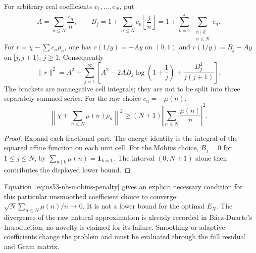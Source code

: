 \begin{proposition}
\label{prop:ns53-nb-divisor-cells}
For arbitrary real coefficients $c_1,\ldots,c_N$, put
\[
 A=\sum_{n\leq N}\frac{c_n}{n},\qquad
 B_j=1+\sum_{n\leq N}c_n\left\lfloor\frac jn\right\rfloor
     =1+\sum_{k=1}^j\ \sum_{\substack{n\mid k\\n\leq N}}c_n.
\]
For $r=\chi-\sum c_n\rho_n$, one has $r(1/y)=-Ay$ on $(0,1)$
and $r(1/y)=B_j-Ay$ on $[j,j+1)$, $j\geq1$. Consequently
\begin{equation}
 \|r\|^2=A^2+\sum_{j=1}^{\infty}
 \left[A^2-2AB_j\log\left(1+\frac1j\right)
          +\frac{B_j^2}{j(j+1)}\right].
 \label{eq:ns53-nb-divisor-energy}
\end{equation}
The brackets are nonnegative cell integrals; they are not to be split
into three separately summed series. For the raw choice $c_n=-\mu(n)$,
\begin{equation}
 \left\|\chi+\sum_{n\leq N}\mu(n)\rho_n\right\|^2
 \geq (N+1)\left|\sum_{n\leq N}\frac{\mu(n)}n\right|^2.
 \label{eq:ns53-nb-mobius-penalty}
\end{equation}
\end{proposition}

\begin{proof}
Expand each fractional part. The energy identity is the integral of the
squared affine function on each unit cell. For the M\"obius choice,
$B_j=0$ for $1\leq j\leq N$, by
$\sum_{n\mid k}\mu(n)=\mathbf 1_{k=1}$. The interval $(0,N+1)$ alone
then contributes the displayed lower bound.
\end{proof}

\begin{remark}
Equation~\eqref{eq:ns53-nb-mobius-penalty} gives an explicit necessary
condition for this particular unsmoothed coefficient choice to converge:
$\sqrt N\sum_{n\leq N}\mu(n)/n\to0$. It is not a lower bound for the
optimal $E_N$. The divergence of the raw natural approximation is already
recorded in B\'aez-Duarte's Introduction; no novelty is claimed for its
failure. Smoothing or adaptive coefficients change the problem and must
be evaluated through the full residual and Gram matrix.
\end{remark}

